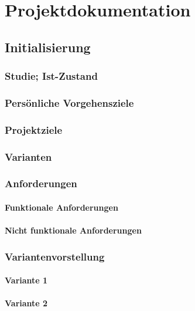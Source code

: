 \part{Projektdokumentation}

\chapter{Initialisierung}
\section{Studie; Ist-Zustand}
\section{Persönliche Vorgehensziele}
\section{Projektziele}
\section{Varianten}
\section{Anforderungen}
\subsection{Funktionale Anforderungen}
\subsection{Nicht funktionale Anforderungen}
\section{Variantenvorstellung}
\subsection{Variante 1}
\subsection{Variante 2}
